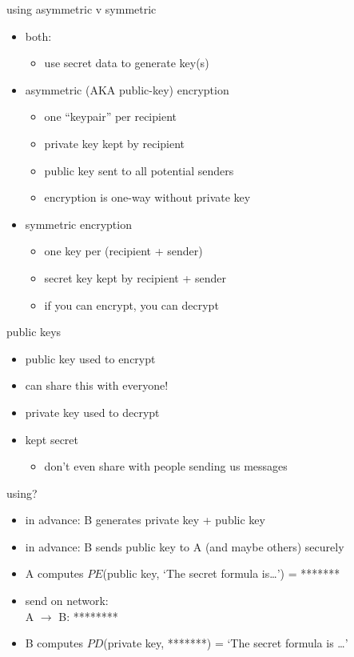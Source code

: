 \begin{frame}{using asymmetric v symmetric}
\begin{itemize}
    \item both:
        \begin{itemize}
            \item use secret data to generate key(s)
        \end{itemize}
    \item asymmetric (AKA public-key) encryption
        \begin{itemize}
            \item one ``keypair'' per recipient
            \item private key kept by recipient
            \item public key sent to all potential senders
            \item encryption is one-way without private key
        \end{itemize}
    \item symmetric encryption
        \begin{itemize}
            \item one key per (recipient + sender)
            \item secret key kept by recipient + sender
            \item if you can encrypt, you can decrypt
        \end{itemize}
\end{itemize}
\end{frame}

\begin{frame}{public keys}
    \begin{itemize}
    \item public key used to encrypt
    \item can share this with everyone!
    \vspace{.5cm}
    \item private key used to decrypt
    \item kept secret
        \begin{itemize}
        \item don't even share with people sending us messages
        \end{itemize}
    \end{itemize}
\end{frame}

\begin{frame}{using?}
    \begin{itemize}
    \item in advance: B generates private key + public key
    \item in advance: B sends public key to A (and maybe others) securely
    \vspace{.5cm}
    \item A computes $PE$(public key, `The secret formula is\ldots') = *******
    \item send on network: \\
    A $\rightarrow$ B: ********
    \item B computes $PD$(private key, *******) = `The secret formula is \ldots'
    \end{itemize}
\end{frame}
